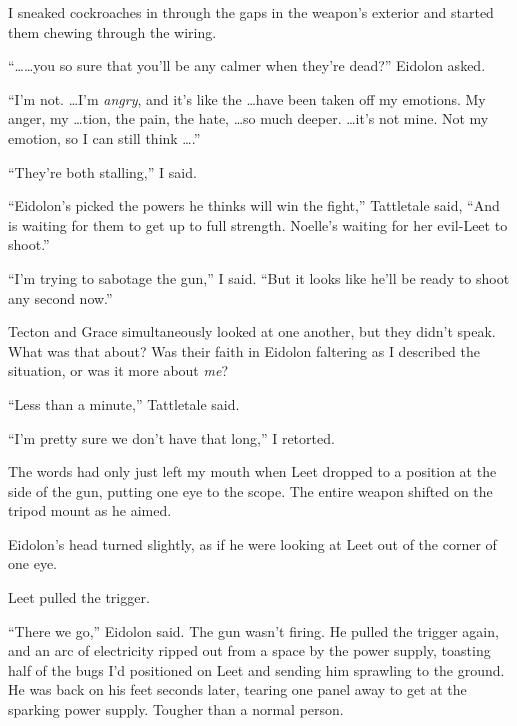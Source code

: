 I sneaked cockroaches in through the gaps in the weapon's exterior and started them chewing through the wiring.



``\ldots \ldots you so sure that you'll be any calmer when they're dead?'' Eidolon asked.



``I'm not.  \ldots I'm \emph{angry}, and it's like the \ldots have been taken off my emotions.  My anger, my \ldots{}tion, the pain, the hate, \ldots so much deeper.  \ldots it's not mine.  Not my emotion, so I can still think \ldots .''



``They're both stalling,'' I said.



``Eidolon's picked the powers he thinks will win the fight,'' Tattletale said, ``And is waiting for them to get up to full strength.  Noelle's waiting for her evil-Leet to shoot.''



``I'm trying to sabotage the gun,'' I said.  ``But it looks like he'll be ready to shoot any second now.''



Tecton and Grace simultaneously looked at one another, but they didn't speak.  What was that about?  Was their faith in Eidolon faltering as I described the situation, or was it more about \emph{me}?



``Less than a minute,'' Tattletale said.



``I'm pretty sure we don't have that long,'' I retorted.



The words had only just left my mouth when Leet dropped to a position at the side of the gun, putting one eye to the scope.  The entire weapon shifted on the tripod mount as he aimed.



Eidolon's head turned slightly, as if he were looking at Leet out of the corner of one eye.



Leet pulled the trigger.



``There we go,'' Eidolon said.  The gun wasn't firing.  He pulled the trigger again, and an arc of electricity ripped out from a space by the power supply, toasting half of the bugs I'd positioned on Leet and sending him sprawling to the ground.  He was back on his feet seconds later, tearing one panel away to get at the sparking power supply.  Tougher than a normal person.



